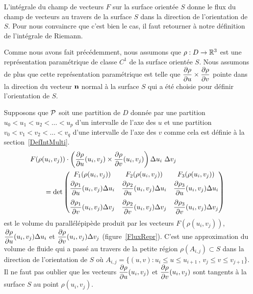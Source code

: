 {\begin{rmk}
L'intégrale du champ de vecteurs $F$ sur la surface orientée $S$
donne le flux du champ de vecteurs au travers de la surface $S$ dans
la direction de l'orientation de $S$.  Pour nous convaincre que c'est
bien le cas, il faut retourner à notre définition de l'intégrale de
Riemann.

Comme nous avons fait précédemment, nous assumons que
$\rho:D\rightarrow \mathbb{R}^3$ est une représentation paramétrique de
classe $C^1$ de la surface orientée $S$.  Nous assumons de plus que
cette représentation paramétrique est telle que
$\displaystyle \frac{\partial \rho}{\partial u} \times \frac{\partial \rho}{\partial v}$ pointe
dans la direction du vecteur $\mathbf{n}$ normal à la surface $S$ qui a
été choisie pour définir l'orientation de $S$.

Supposons que $\cal P$ soit une partition de $D$ donnée par une partition
$u_0 < u_1 < u_2 < \ldots < u_p$ d'un intervalle de l'axe des $u$ et
une partition $v_0 < v_1 < v_2 < \ldots < v_{q}$ d'une intervalle de
l'axe des $v$ comme cela est définie à la section~\ref{DefIntMulti}.
\begin{align*}
&F(\rho(u_i,v_j)) \cdot
\left( \frac{\partial \rho}{\partial u}(u_i,v_j) \times \frac{\partial \rho}{\partial v}(u_i,v_j) \right)
\Delta u_i \ \Delta v_j \\
& \qquad = \det
\begin{pmatrix}
F_1(\rho(u_i,v_j)) & F_2(\rho(u_i,v_j)) & F_3(\rho(u_i,v_j)) \\[0.3em]
\displaystyle \frac{\partial \rho_1}{\partial u}(u_i,v_j) \Delta u_i &
\displaystyle \frac{\partial \rho_2}{\partial u}(u_i,v_j) \Delta u_i &
\displaystyle \frac{\partial \rho_3}{\partial u}(u_i,v_j) \Delta u_i \\[1em]
\displaystyle \frac{\partial \rho_1}{\partial v}(u_i,v_j) \Delta v_j &
\displaystyle \frac{\partial \rho_2}{\partial v}(u_i,v_j) \Delta v_j &
\displaystyle \frac{\partial \rho_3}{\partial v}(u_i,v_j) \Delta v_j
\end{pmatrix}
\end{align*}
est le volume du parallélépipède produit par les vecteurs
$F(\rho(u_i,v_j))$,
$\displaystyle \frac{\partial \rho}{\partial u}(u_i,v_j) \Delta u_i$ et
$\displaystyle \frac{\partial \rho}{\partial v}(u_i,v_j) \Delta v_j$
(figure~\ref{FluxRepr}).  C'est une approximation du
volume de fluide qui a passé au travers de la petite région
$\rho(A_{i,j}) \subset S$ dans la direction de l'orientation de $S$ où
$A_{i,j} = \{(u,v) : u_i \leq u \leq u_{i+1}\, , \, v_j\leq v \leq v_{j+1}\}$.
Il ne faut pas oublier que les vecteurs
$\displaystyle \frac{\partial \rho}{\partial u}(u_i,v_j)$ et
$\displaystyle \frac{\partial \rho}{\partial v}(u_i,v_j)$ sont tangents à la surface
$S$ au point $\rho(u_i,v_j)$.


\end{rmk}}
